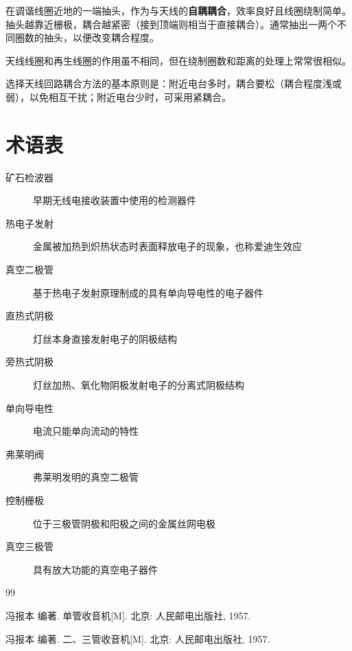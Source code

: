 \documentclass[12pt,UTF8]{ctexbook}
\begin{document}
在调谐线圈近地的一端抽头，作为与天线的\textbf{自耦耦合}，效率良好且线圈绕制简单。抽头越靠近栅极，耦合越紧密（接到顶端则相当于直接耦合）。通常抽出一两个不同圈数的抽头，以便改变耦合程度。

天线线圈和再生线圈的作用虽不相同，但在绕制圈数和距离的处理上常常很相似。

选择天线回路耦合方法的基本原则是：附近电台多时，耦合要松（耦合程度浅或弱），以免相互干扰；附近电台少时，可采用紧耦合。

\chapter{术语表}

\begin{description}
    \item[矿石检波器] 早期无线电接收装置中使用的检测器件
    \item[热电子发射] 金属被加热到炽热状态时表面释放电子的现象，也称爱迪生效应
    \item[真空二极管] 基于热电子发射原理制成的具有单向导电性的电子器件
    \item[直热式阴极] 灯丝本身直接发射电子的阴极结构
    \item[旁热式阴极] 灯丝加热、氧化物阴极发射电子的分离式阴极结构
    \item[单向导电性] 电流只能单向流动的特性
    \item[弗莱明阀] 弗莱明发明的真空二极管
    \item[控制栅极] 位于三极管阴极和阳极之间的金属丝网电极
    \item[真空三极管] 具有放大功能的真空电子器件
\end{description}

\backmatter

\begin{thebibliography}{99}
\item 冯报本 编著. 单管收音机[M]. 北京: 人民邮电出版社, 1957.
\item 冯报本 编著. 二、三管收音机[M]. 北京: 人民邮电出版社, 1957.
\end{thebibliography}
\end{document}
